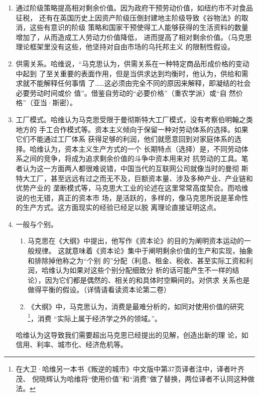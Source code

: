 \begin{enumerate}
\item 通过阶级策略提高相对剩余价值。因为政府干预劳动价值，如纽约市不对食品征税，
还有在英国历史上因资产阶级压倒封建地主阶级导致《谷物法》的取消，这些有意识的阶级
策略和国家干预使得工人能够获得的生活资料的数量增加了，从而造成工人劳动力价值降低，
进而提高了相对剩余价值。（马克思理论框架里没有这些，他坚持对自由市场的乌托邦主义
的限制性假设。

\item 供需关系。哈维说，“马克思认为，供需关系在一种特定商品形成价格的变动中起到
了至关重要的表面作用，但是当供求达到均衡时，他认为，供给和需求就不能解释任何事情
了……这必须由完全不同的原因来解释，即凝结的社会必要劳动时间或价
值”。借鉴自劳动的“必要价格”（重农学派）或“自
然价格”（亚当·斯密）。

\item 工厂模式。哈维认为马克思受限于曼彻斯特大工厂模式，没有考察伯明翰之类地方的
手工合作模式等。资本主义倾向于保留一种对劳动体系的选择。如果它们不能通过工厂体系
获得足够的利润，他们就愿意回到对家庭体系的选择。哈维认为，资本主义生产方式的一个
长期特点（选择）是，不同劳动体系之间的竞争，将成为追求剩余价值的斗争中资本用来对
抗劳动的工具。笔者认为这一方面两人都很难说错，中国当代的互联网公司就像当时的曼彻
斯特大工厂，甚至远远有过之而无不及，巨额资本量、涉及多种产业、产业链和优势产业的
垄断模式等，马克思大工业的论述在这里常常高度契合。而哈维说的也无错，真正的资本市
场，是活跃的，多样的，像马克思所说是革命性的生产方式。这方面现实的经验已经足以脱
离理论直接证明这点。

\item 一般与个别。

  \begin{enumerate}
    \item 马克思在《大纲》中提出，他写作《资本论》的目的为阐明资本运动的一般规律。
这就意味着《资本论》集中于阐明剩余价值的生产和实现，抽象和排除掉他称之为“个别
的”分配（利息、租金、税收、甚至实际工资和利润，哈维认为如果对这些个别分配细致分
析的话可能产生不一样的结论），因为它们都是偶然的、相关的和具体时空瞬间的。对供求
关系也是做得平衡的假设。（详情请看读资本论第二卷）

    \item 《大纲》中，马克思认为，消费是最难分析的，如同对使用价值的研究
\footnote{在大卫·哈维另一本书《叛逆的城市》中文版中第37页译者注中，译者叶齐茂、
倪晓辉认为哈维将“使用价值”和“消费”做了替换，两位译者不认同这种做法。}，消费
“实际上属于经济学之外的领域。”。
    \end{enumerate}哈维认为这导致我们需要超出马克思已经提出的见解，创造出新的理
论，如信用、利率、城市化、经济危机等。

\end{enumerate}

